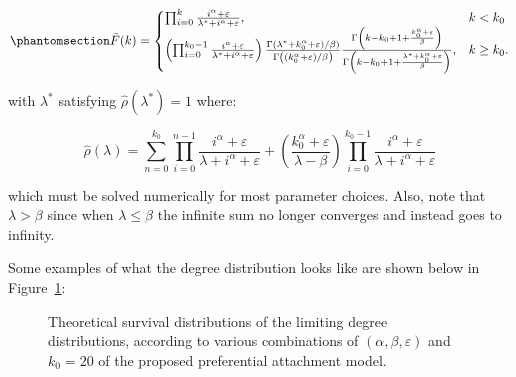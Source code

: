 \documentclass[
  sn-basic,
]{sn-jnl}
\theoremstyle{plain}
\theoremstyle{remark}
\begin{document}
\begin{equation}\phantomsection\label{eq-polysurv}{
\bar F(k) = \begin{cases}
\prod_{i=0}^{k}\frac{i^\alpha + \varepsilon}{\lambda^*+i^\alpha + \varepsilon},&k<k_0\\
\left(\prod_{i=0}^{k_0-1}\frac{i^\alpha + \varepsilon}{\lambda^*+i^\alpha + \varepsilon}\right)\frac{\Gamma(\lambda^*+k_0^\alpha + \varepsilon)/\beta)}{\Gamma\left((k_0^\alpha + \varepsilon)/\beta\right)} \frac{\Gamma\left(k-k_0 + 1 +\frac{k_0^\alpha + \varepsilon}{\beta}\right)}{\Gamma\left(k-k_0 + 1 +\frac{\lambda^* +k_0^\alpha + \varepsilon}{\beta}\right)},&k\ge k_0.
\end{cases}
}\end{equation}

with \(\lambda^*\) satisfying \(\hat \rho(\lambda^*)=1\) where:

\[
\hat\rho(\lambda) = \sum_{n=0}^{k_0}\prod_{i=0}^{n-1}\frac{i^\alpha + \varepsilon}{\lambda+i^\alpha + \varepsilon} + \left(\frac{k_0^\alpha + \varepsilon}{\lambda-\beta}\right)\prod_{i=0}^{k_0-1}\frac{i^\alpha + \varepsilon}{\lambda + i^\alpha + \varepsilon} 
\]

which must be solved numerically for most parameter choices. Also, note
that \(\lambda>\beta\) since when \(\lambda\le \beta\) the infinite sum
no longer converges and instead goes to infinity.

Some examples of what the degree distribution looks like are shown below
in Figure~\ref{fig-polylinsurv}:

\begin{figure}[H]


\caption{\label{fig-polylinsurv}Theoretical survival distributions of
the limiting degree distributions, according to various combinations of
\((\alpha, \beta, \varepsilon)\) and \(k_0=20\) of the proposed
preferential attachment model.}

\end{figure}%
\end{document}
